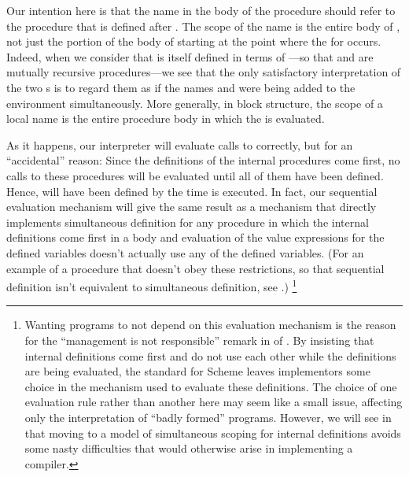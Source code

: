 Our intention here is that the name  in the body of the procedure  should refer to the procedure  that is defined after .
The scope of the name  is the entire body of , not just the portion of the body of  starting at the point where the  for  occurs.
Indeed, when we consider that  is itself defined in terms of ---so that  and  are mutually recursive procedures---we see that the only satisfactory interpretation of the two s is to regard them as if the names  and  were being added to the environment simultaneously.
More generally, in block structure, the scope of a local name is the entire procedure body in which the  is evaluated.

As it happens, our interpreter will evaluate calls to  correctly, but for an “accidental” reason:
Since the definitions of the internal procedures come first, no calls to these procedures will be evaluated until all of them have been defined.
Hence,   will have been defined by the time  is executed.
In fact, our sequential evaluation mechanism will give the same result as a mechanism that directly implements simultaneous definition for any procedure in which the internal definitions come first in a body and evaluation of the value expressions for the defined variables doesn’t actually use any of the defined variables.
(For an example of a procedure that doesn’t obey these restrictions, so that sequential definition isn’t equivalent to simultaneous definition, see .)%
\footnote{
	Wanting programs to not depend on this evaluation mechanism is the reason for the “management is not responsible” remark in  of .
	By insisting that internal definitions come first and do not use each other while the definitions are being evaluated, the  standard for Scheme leaves implementors some choice in the mechanism used to evaluate these definitions.
	The choice of one evaluation rule rather than another here may seem like a small issue, affecting only the interpretation of “badly formed” programs.
	However, we will see in  that moving to a model of simultaneous scoping for internal definitions avoids some nasty difficulties that would otherwise arise in implementing a compiler.
}

